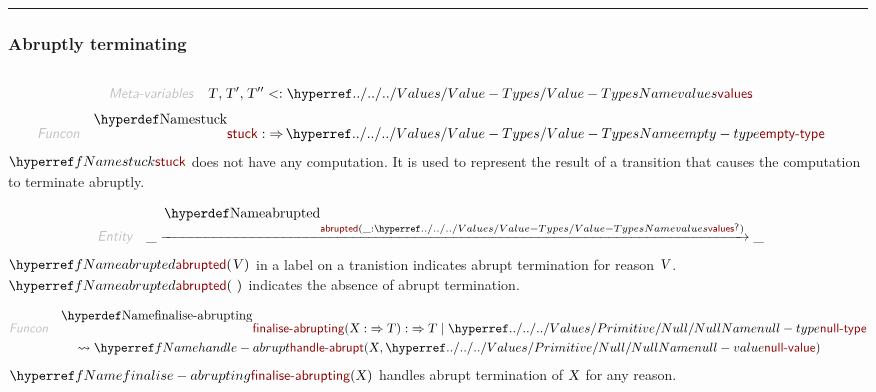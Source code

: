 

\begin{center}
\rule{3in}{0.4pt}
\end{center}

\subsubsection{Abruptly terminating}\hypertarget{abruptly-terminating}{}\label{abruptly-terminating}

\begin{align*}
  [ \
  \KEY{Funcon} \quad & \NAMEREF{stuck} \\
  \KEY{Entity} \quad & \NAMEREF{abrupted} \\
  \KEY{Funcon} \quad & \NAMEREF{finalise-abrupting} \\
  \KEY{Funcon} \quad & \NAMEREF{abrupt} \\
  \KEY{Funcon} \quad & \NAMEREF{handle-abrupt} \\
  \KEY{Funcon} \quad & \NAMEREF{finally}
  \ ]
\end{align*}
\begin{align*}
  \KEY{Meta-variables} \quad
  & \VAR{T}, \VAR{T}', \VAR{T}'' <: \NAMEHYPER{../../../Values}{Value-Types}{values}
\end{align*}
\begin{align*}
  \KEY{Funcon} \quad
  & \NAMEDECL{stuck} 
    :  \TO \NAMEHYPER{../../../Values}{Value-Types}{empty-type} 
\end{align*}
$\SHADE{\NAMEREF{stuck}}$ does not have any computation. It is used to represent the result of
  a transition that causes the computation to terminate abruptly.

\begin{align*}
  \KEY{Entity} \quad
  & \_ \xrightarrow{\NAMEDECL{abrupted}(\_ : \NAMEHYPER{../../../Values}{Value-Types}{values}\QUERY)} \_
\end{align*}
$\SHADE{\NAMEREF{abrupted}
           (  \VAR{V} )}$ in a label on a tranistion indicates abrupt termination for
  reason $\SHADE{\VAR{V}}$. $\SHADE{\NAMEREF{abrupted}
           (   \  )}$ indicates the absence of abrupt termination.

\begin{align*}
  \KEY{Funcon} \quad
  & \NAMEDECL{finalise-abrupting}(
                       \VAR{X} :  \TO \VAR{T}) 
    :  \TO \VAR{T}  \mid \NAMEHYPER{../../../Values/Primitive}{Null}{null-type} \\&\quad
    \leadsto \NAMEREF{handle-abrupt}
               (  \VAR{X}, 
                      \NAMEHYPER{../../../Values/Primitive}{Null}{null-value} )
\end{align*}
$\SHADE{\NAMEREF{finalise-abrupting}
           (  \VAR{X} )}$ handles abrupt termination of $\SHADE{\VAR{X}}$ for any reason.

